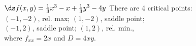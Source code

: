 {$\ds f(x,y) = \frac13x^3-x+\frac13y^3-4y$
}
{
There are 4 critical points: \\
$(-1,-2)$, rel. max; $(1,-2)$, saddle point;\\
$(-1,2)$, saddle point; $(1,2)$, rel. min.,\\
where $f_{xx} = 2x$ and $D = 4xy$.
}